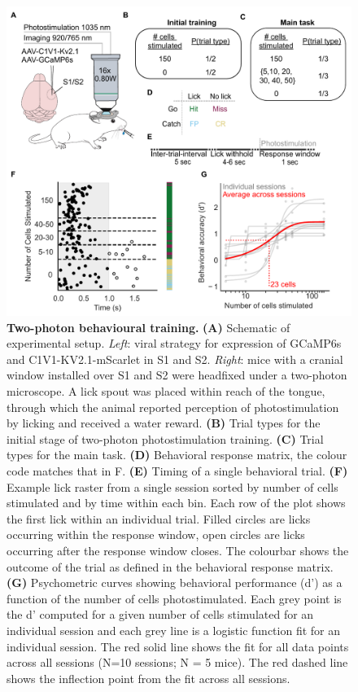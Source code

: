 \begin{figure}[h]
\includegraphics[scale=0.78]{figures/2-photon-behaviour.pdf}
\caption[\textbf{Two-photon behavioural training.}]{
\textbf{Two-photon behavioural training.}
\textbf{(A)} Schematic of experimental setup. \textit{Left}: viral strategy for expression of GCaMP6s and C1V1-KV2.1-mScarlet in S1 and S2.  \textit{Right}: mice with a cranial window installed over S1 and S2 were headfixed under a two-photon microscope. A lick spout was placed within reach of the tongue, through which the animal reported perception of photostimulation by licking and received a water reward. \textbf{(B)} Trial types for the initial stage of two-photon photostimulation training. \textbf{(C)} Trial types for the main task.  \textbf{(D)} Behavioral response matrix, the colour code matches that in F. \textbf{(E)} Timing of a single behavioral trial. \textbf{(F)} Example lick raster from a single session sorted by number of cells stimulated and by time within each bin. Each row of the plot shows the first lick within an individual trial. Filled circles are licks occurring within the response window, open circles are licks occurring after the response window closes. The colourbar shows the outcome of the trial as defined in the behavioral response matrix. \textbf{(G)} Psychometric curves showing behavioral performance (d’) as a function of the number of cells photostimulated. Each grey point is the d’ computed for a given number of cells stimulated for an individual session and each grey line is a logistic function fit for an individual session. The red solid line shows the fit for all data points across all sessions (N=10 sessions; N = 5 mice). The red dashed line shows the inflection point from the fit across all sessions. 
} 
\label{fig:2-photon-behaviour}
\end{figure}


